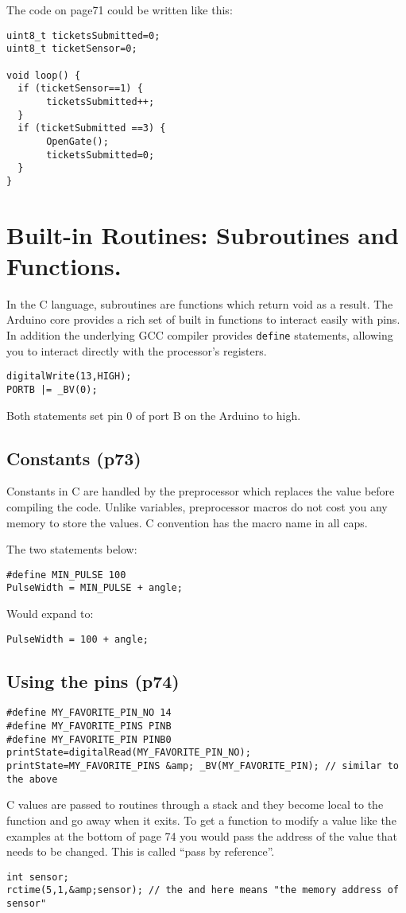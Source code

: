 \documentclass{book}
\begin{document}
The code on page71 could be written like this:
\begin{verbatim}
uint8_t ticketsSubmitted=0;
uint8_t ticketSensor=0;

void loop() {
  if (ticketSensor==1) {
       ticketsSubmitted++;
  }
  if (ticketSubmitted ==3) {
       OpenGate();
       ticketsSubmitted=0;
  }
}
\end{verbatim}


\section{Built-in Routines: Subroutines and Functions.}
In the C language, subroutines are functions which return void as a result. The Arduino core provides a rich set of built in functions to interact easily with pins. In addition the underlying GCC compiler provides \verb|define| statements, allowing you to interact directly with the processor's registers.

\begin{verbatim}
digitalWrite(13,HIGH);
PORTB |= _BV(0);
\end{verbatim}

Both statements set pin 0 of port B on the Arduino to high.

\subsection{Constants (p73)}
Constants in C are handled by the preprocessor which replaces the value before compiling the code. Unlike variables, preprocessor macros do not cost you any memory to store the values. C convention has the macro name in all caps.

The two statements below:
\begin{verbatim}
#define MIN_PULSE 100
PulseWidth = MIN_PULSE + angle;
\end{verbatim}
Would expand to:
\begin{verbatim}
PulseWidth = 100 + angle;
\end{verbatim}

\subsection{Using the pins (p74)}
\begin{verbatim}
#define MY_FAVORITE_PIN_NO 14
#define MY_FAVORITE_PINS PINB
#define MY_FAVORITE_PIN PINB0
printState=digitalRead(MY_FAVORITE_PIN_NO);
printState=MY_FAVORITE_PINS &amp; _BV(MY_FAVORITE_PIN); // similar to the above
\end{verbatim}
C values are passed to routines through a stack and they become local to the function and go away when it exits. To get a function to modify a value like the examples at the bottom of page 74 you would pass the address of the value that needs to be changed. This is called ``pass by reference''.
\begin{verbatim}
int sensor;
rctime(5,1,&amp;sensor); // the and here means "the memory address of sensor"
\end{verbatim}
\end{document}
